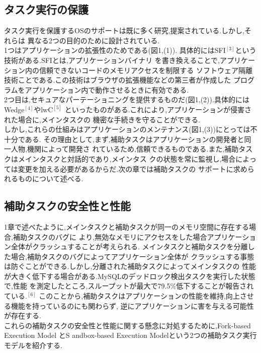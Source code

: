 \documentclass[submit,techreq,noauthor]{eco}	%
\begin{document}
\subsection{タスク実行の保護}
\indent タスク実行を保護するOSのサポートは既に多く研究,提案されている.しかし,それらは
異なる2つの目的のために設計されている.\\
1つはアプリケーションの拡張性のためである(図1,(1)).
具体的にはSFI\begin{math}^{[3]}\end{math}という技術がある.SFIとは,アプリケーションバイナリ
を書き換えることで,アプリケーション内の信頼できないコードのメモリアクセスを制限する
ソフトウェア隔離技術ことである.この技術はブラウザの拡張機能などの第三者が作成した
プログラムをアプリケーション内で動作させるときに有効である.\\
2つ目は,セキュアなパーテーショニングを提供するものだ(図1,(2)).具体的には
Wedge\begin{math}^{[4]}\end{math}やlwC\begin{math}^{[5]}\end{math}
といったものがある.これにより,アプリケーションが侵害された場合に,メインタスクの
機密な手続きを守ることができる.\\
しかし,これらの仕組みはアプリケーションのメンテナンス(図1,(3))にとっては不十分である.
その理由として,まず,補助タスクはアプリケーションの開発者と同一人物,機関によって開発さ
れているため,信頼できるものである.また,補助タスクはメインタスクと対話的であり,メインタス
クの状態を常に監視し,場合によっては変更を加える必要があるからだ.次の章では補助タスクの
サポートに求められるものについて述べる.

\subsection{補助タスクの安全性と性能}
1章で述べたように,メインタスクと補助タスクが同一のメモリ空間に存在する場合,補助タスクのバグに
より,無効なメモリにアクセスをした場合アプリケーション全体がクラッシュすることが考えられる.
メインタスクと補助タスクを分離した場合,補助タスクのバグによってアプリケーション全体が
クラッシュする事態は防ぐことができる.しかし,分離された補助タスクによってメインタスクの
性能が大きく低下する場合がある.MySQLのデッドロック検出タスクを実行した状態で,性能
を測定したところ,スループットが最大で79.5\%低下することが報告されている.\begin{math}^{[6]}\end{math}
このことから,補助タスクはアプリケーションの性能を維持,向上させる機能を持っているのにも関わらず,
逆にアプリケーションに害を与える可能性が存在する.\\
\indent これらの補助タスクの安全性と性能に関する懸念に対処するために,Fork-based Execution Model とS
andbox-based Execution Modelという2つの補助タスク実行モデルを紹介する.
\end{document}
